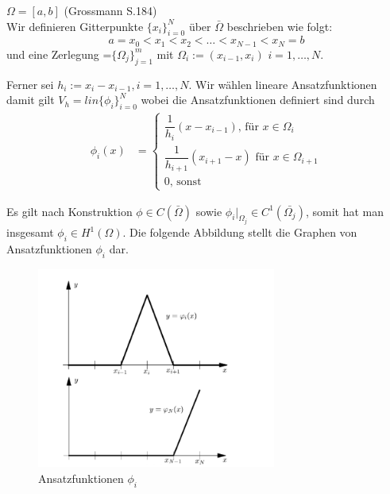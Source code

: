 \begin{Beispiel} $\Omega = [a,b]$ (Grossmann S.184) \\
Wir definieren Gitterpunkte $\{x_i\}_{i=0}^{N}$ über $\bar\Omega$  beschrieben wie folgt:
\begin{equation*}
a = x_0 < x_1 < x_2 < \dots < x_{N-1} < x_N = b
\end{equation*}
und eine Zerlegung  {}=$\{ \Omega_j \}_{j=1}^{m}$ mit $\Omega_i := (x_{i-1},x_i)$ $i=1,\dots,N$. 
\end{Beispiel}
Ferner sei $h_i := x_i - x_{i-1}, i=1,\dots,N$. Wir wählen lineare Ansatzfunktionen damit gilt $V_h=lin\{\phi_i\}_{i=0}^{N}$ wobei die Ansatzfunktionen definiert sind durch
\begin{equation}
\begin{aligned}
\phi_i(x) &= 
\begin{cases}
\dfrac{1}{h_i}(x-x_{i-1}) \text{, für } x \in \Omega_i \\
\dfrac{1}{h_{i+1}}(x_{i+1}-x) \text{ für } x \in \Omega_{i+1}  \\
0 \text{, sonst }
\end{cases}
\end{aligned}
\end{equation}

Es gilt nach Konstruktion $\phi \in C(\bar{\Omega})$ sowie $\phi_{i} \Big|_{\Omega_{j}} \in C^{1}(\bar{\Omega_{j}})$, somit hat man insgesamt $\phi_i \in H^{1}(\Omega)$.
Die folgende Abbildung stellt die Graphen von Ansatzfunktionen $\phi_i$ dar.

\begin{figure}[ht]
	\centering
  \includegraphics[width=0.7\textwidth]{hatfunction.png}
	\caption{Ansatzfunktionen $\phi_i$}
	\label{fig:hat}
\end{figure}

